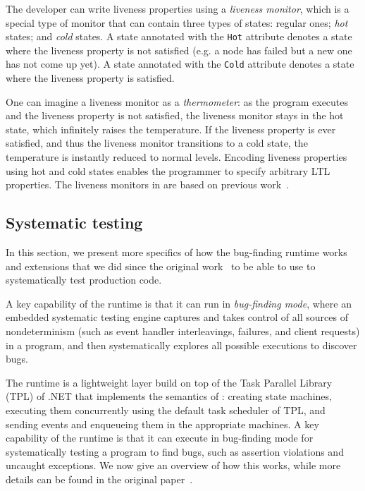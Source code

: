 The \psharp developer can write liveness properties using a \emph{liveness monitor}, which is a special type of monitor that can contain three types of states: regular ones; \emph{hot} states; and \emph{cold} states. A state annotated with the \texttt{Hot} attribute denotes a state where the liveness property is not satisfied (e.g. a node has failed but a new one has not come up yet). A state annotated with the \texttt{Cold} attribute denotes a state where the liveness property is satisfied.

One can imagine a liveness monitor as a \emph{thermometer}: as the program executes and the liveness property is not satisfied, the liveness monitor stays in the hot state, which infinitely raises the temperature. If the liveness property is ever satisfied, and thus the liveness monitor transitions to a cold state, the temperature is instantly reduced to normal levels. Encoding liveness properties using hot and cold states enables the programmer to specify arbitrary LTL properties. The liveness monitors in \psharp are based on previous work~\cite{Desai:EECS-2015-198}.

\subsection{Systematic testing}
\label{sec:psharp:testing}
In this section, we present more specifics of how the \psharp bug-finding runtime works and extensions that we did since the original work~\cite{deligiannis2015psharp} to be able to use \psharp to systematically test production code.

A key capability of the \psharp runtime is that it can run in \emph{bug-finding mode}, where an embedded systematic testing engine captures and takes control of all sources of nondeterminism (such as event handler interleavings, failures, and client requests) in a \psharp program, and then systematically explores all possible executions to discover bugs.

The \psharp runtime is a lightweight layer build on top of the Task Parallel Library (TPL) of .NET that implements the semantics of \psharp: creating state machines, executing them concurrently using the default task scheduler of TPL, and sending events and enqueueing them in the appropriate machines. A key capability of the \psharp runtime is that it can execute in bug-finding mode for systematically testing a \psharp program to find bugs, such as assertion violations and uncaught exceptions. We now give an overview of how this works, while more details can be found in the original paper~\cite{deligiannis2015psharp}.

